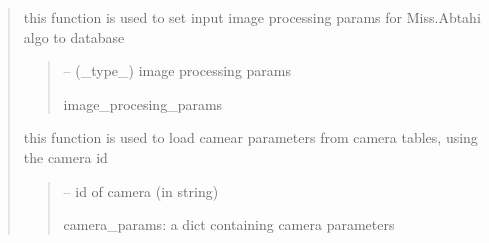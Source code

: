 \documentclass[letterpaper,10pt,english]{sphinxmanual}
\begin{document}
\begin{quote}
\begin{savenotes}
\begin{fulllineitems}
\begin{savenotes}\begin{fulllineitems}
\label{\detokenize{setting/database_utils:oxin.database_utils.dataBaseUtils.get_image_processing_parms}}
\pysigstartsignatures
{}
\pysigstopsignatures
\sphinxAtStartPar
this function is used to set input image processing params for Miss.Abtahi algo to database
\begin{quote}\begin{description}
\sphinxAtStartPar
{} – (\_type\_) image processing params

\sphinxAtStartPar
image\_procesing\_params

\end{description}\end{quote}

\end{fulllineitems}\end{savenotes}


\begin{savenotes}\begin{fulllineitems}
\label{\detokenize{setting/database_utils:oxin.database_utils.dataBaseUtils.load_cam_params}}
\pysigstartsignatures
{}
\pysigstopsignatures
\sphinxAtStartPar
this function is used to load camear parameters from camera tables, using the camera id
\begin{quote}\begin{description}
\sphinxAtStartPar
{} – id of camera (in string)

\sphinxAtStartPar
camera\_params: a dict containing camera parameters

\end{description}\end{quote}

\end{fulllineitems}\end{savenotes}



\end{fulllineitems}
\end{savenotes}
\end{quote}
\end{document}
